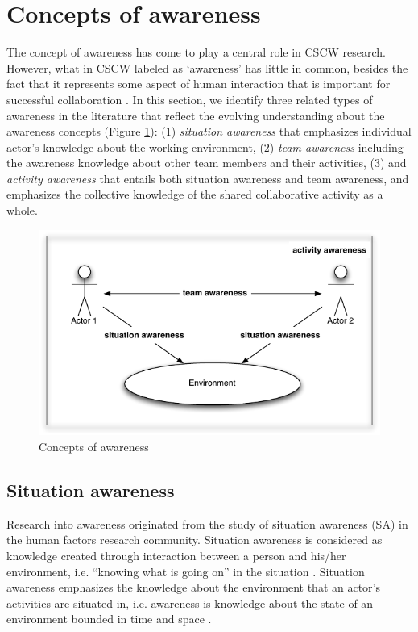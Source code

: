 \section{Concepts of awareness} %
\label{sec:concepts_of_awareness}
The concept of awareness has come to play a central role in CSCW research. However, what in CSCW labeled as `awareness' has little in common, besides the fact that it represents some aspect of human interaction that is important for successful collaboration \cite{schmidt2002a}. In this section, we identify three related types of awareness in the literature that reflect the evolving understanding about the awareness concepts (Figure \ref{fig:concepts_of_awareness}): (1) \emph{situation awareness} that emphasizes individual actor's knowledge about the working environment, (2) \emph{team awareness} including the awareness knowledge about other team members and their activities, (3) and \emph{activity awareness} that entails both situation awareness and team awareness, and emphasizes the collective knowledge of the shared collaborative activity as a whole.

\begin{figure}[htbp] %
   \centering
   \includegraphics{concepts_of_awareness.pdf} 
   \caption{Concepts of awareness}
   \label{fig:concepts_of_awareness}
\end{figure}


\subsection{Situation awareness} %
\label{sub:situation_awareness}
Research into awareness originated from the study of situation awareness (SA) in the human factors research community. Situation awareness is considered as knowledge created through interaction between a person and his/her environment, i.e. ``knowing what is going on'' in the situation \cite{Endsley1995}. Situation awareness emphasizes the knowledge about the environment that an actor's activities are situated in, i.e. awareness is knowledge about the state of an environment bounded in time and space \cite{Adams1995}.

